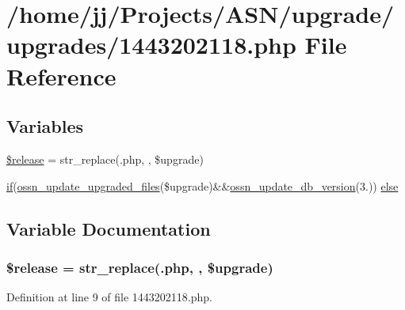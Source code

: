 \hypertarget{1443202118_8php}{}\section{/home/jj/\+Projects/\+A\+S\+N/upgrade/upgrades/1443202118.php File Reference}
\label{1443202118_8php}
\subsection*{Variables}
\begin{DoxyCompactItemize}
\item 
\hyperlink{1443202118_8php_a63c5d6a8a9f1768ea926cee666dc991b}{\$release} = str\+\_\+replace(\textquotesingle{}.php\textquotesingle{}, \textquotesingle{}\textquotesingle{}, \$upgrade)
\item 
\hyperlink{jquery_8tokeninput_8js_ad8dd46a3cbc004569e34401e9e71771a}{if}(\hyperlink{ossn_8lib_8upgrade_8php_af5e235e44fa65a589d768b2693399250}{ossn\+\_\+update\+\_\+upgraded\+\_\+files}(\$upgrade)\&\&\hyperlink{ossn_8lib_8upgrade_8php_aa7120e10a9c14b722b0e25c99bc86d92}{ossn\+\_\+update\+\_\+db\+\_\+version}(\textquotesingle{}3.\textquotesingle{})) \hyperlink{1443202118_8php_afd3a61a83f69be7720ba0a5b7bd32e8a}{else}
\end{DoxyCompactItemize}


\subsection{Variable Documentation}
\subsubsection[{\texorpdfstring{\$release}{$release}}]{\setlength{\rightskip}{0pt plus 5cm}\$release = str\+\_\+replace(\textquotesingle{}.php\textquotesingle{}, \textquotesingle{}\textquotesingle{}, \$upgrade)}\hypertarget{1443202118_8php_a63c5d6a8a9f1768ea926cee666dc991b}{}\label{1443202118_8php_a63c5d6a8a9f1768ea926cee666dc991b}


Definition at line 9 of file 1443202118.\+php.

